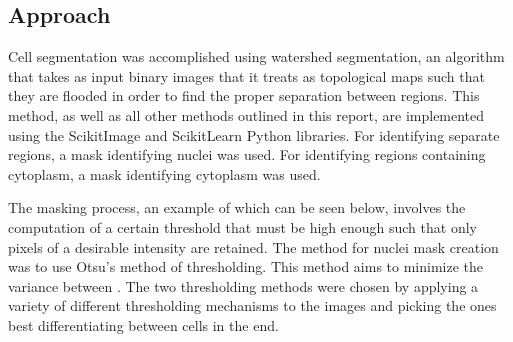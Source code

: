 \documentclass[11pt]{article}
\begin{document}
\subsection{Approach}

Cell segmentation was accomplished using watershed segmentation, an algorithm that takes as input
binary images that it treats as topological maps such that they are flooded in order to find the
proper separation between regions. This method, as well as all other methods outlined in this
report, are implemented using the ScikitImage and ScikitLearn Python libraries. For identifying
separate regions, a mask identifying nuclei was used. For identifying regions containing cytoplasm,
a mask identifying cytoplasm was used. 

The masking process, an example of which can be seen below, involves the computation of a certain
threshold that must be high enough such that only pixels of a desirable intensity are retained. The
method for nuclei mask creation was to use Otsu's method of thresholding. This method aims to
minimize the variance between . The two thresholding methods were chosen by applying a variety of
different thresholding mechanisms to the images and picking the ones best differentiating between
cells in the end. 
\end{document}
